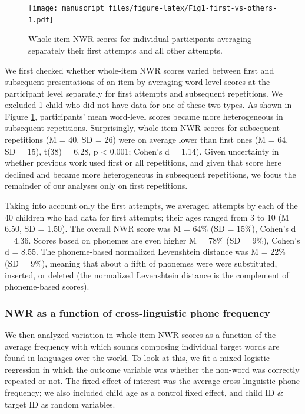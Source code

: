 \documentclass[english,,man,floatsintext]{apa6}
\begin{document}
\begin{figure}
\centering
\texttt{[image: manuscript\_files/figure-latex/Fig1-first-vs-others-1.pdf]}
\caption{\label{fig:Fig1-first-vs-others}Whole-item NWR scores for
individual participants averaging separately their first attempts and
all other attempts.}
\end{figure}

We first checked whether whole-item NWR scores varied between first and
subsequent presentations of an item by averaging word-level scores at
the participant level separately for first attempts and subsequent
repetitions. We excluded 1 child who did not have data for one of these
two types. As shown in Figure \ref{fig:Fig1-first-vs-others},
participants' mean word-level scores became more heterogeneous in
subsequent repetitions. Surprisingly, whole-item NWR scores for
subsequent repetitions (M = 40, SD = 26) were on average lower than
first ones (M = 64, SD = 15), t(38) = 6.28, p \textless{} 0.001; Cohen's
d = 1.14). Given uncertainty in whether previous work used first or all
repetitions, and given that score here declined and became more
heterogeneous in subsequent repetitions, we focus the remainder of our
analyses only on first repetitions.

Taking into account only the first attempts, we averaged attempts by
each of the 40 children who had data for first attempts; their ages
ranged from 3 to 10 (M = 6.50, SD = 1.50). The overall NWR score was M =
64\% (SD = 15\%), Cohen's d = 4.36. Scores based on phonemes are even
higher M = 78\% (SD = 9\%), Cohen's d = 8.55. The phoneme-based
normalized Levenshtein distance was M = 22\% (SD = 9\%), meaning that
about a fifth of phonemes were were substituted, inserted, or deleted
(the normalized Levenshtein distance is the complement of phoneme-based
scores).

\subsubsection{NWR as a function of cross-linguistic phone
frequency}\label{nwr-as-a-function-of-cross-linguistic-phone-frequency}

We then analyzed variation in whole-item NWR scores as a function of the
average frequency with which sounds composing individual target words
are found in languages over the world. To look at this, we fit a mixed
logistic regression in which the outcome variable was whether the
non-word was correctly repeated or not. The fixed effect of interest was
the average cross-linguistic phone frequency; we also included child age
as a control fixed effect, and child ID \& target ID as random
variables.
\end{document}
